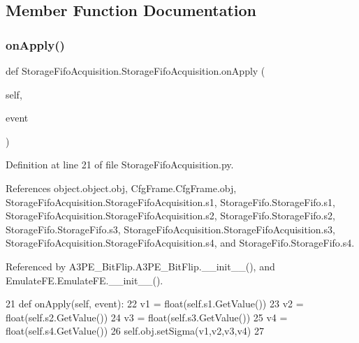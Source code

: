 \subsection{Member Function Documentation}
\mbox{\label{classStorageFifoAcquisition_1_1StorageFifoAcquisition_a42ea0140c1ae56bcd5a6f4422f49bb13}} 
\subsubsection{\texorpdfstring{on\+Apply()}{onApply()}}
{\footnotesize\ttfamily def Storage\+Fifo\+Acquisition.\+Storage\+Fifo\+Acquisition.\+on\+Apply (\begin{DoxyParamCaption}\item[{}]{self,  }\item[{}]{event }\end{DoxyParamCaption})}



Definition at line 21 of file Storage\+Fifo\+Acquisition.\+py.



References object.\+object.\+obj, Cfg\+Frame.\+Cfg\+Frame.\+obj, Storage\+Fifo\+Acquisition.\+Storage\+Fifo\+Acquisition.\+s1, Storage\+Fifo.\+Storage\+Fifo.\+s1, Storage\+Fifo\+Acquisition.\+Storage\+Fifo\+Acquisition.\+s2, Storage\+Fifo.\+Storage\+Fifo.\+s2, Storage\+Fifo.\+Storage\+Fifo.\+s3, Storage\+Fifo\+Acquisition.\+Storage\+Fifo\+Acquisition.\+s3, Storage\+Fifo\+Acquisition.\+Storage\+Fifo\+Acquisition.\+s4, and Storage\+Fifo.\+Storage\+Fifo.\+s4.



Referenced by A3\+P\+E\+\_\+\+Bit\+Flip.\+A3\+P\+E\+\_\+\+Bit\+Flip.\+\_\+\+\_\+init\+\_\+\+\_\+(), and Emulate\+F\+E.\+Emulate\+F\+E.\+\_\+\+\_\+init\+\_\+\+\_\+().


\begin{DoxyCode}
21     \textcolor{keyword}{def }onApply(self, event):
22         v1 = float(self.s1.GetValue())
23         v2 = float(self.s2.GetValue())
24         v3 = float(self.s3.GetValue())
25         v4 = float(self.s4.GetValue())
26         self.obj.setSigma(v1,v2,v3,v4)
27 
\end{DoxyCode}
\mbox{\label{classStorageFifoAcquisition_1_1StorageFifoAcquisition_ac668e50730d5b34daa15e82cbb37ae16}} 
